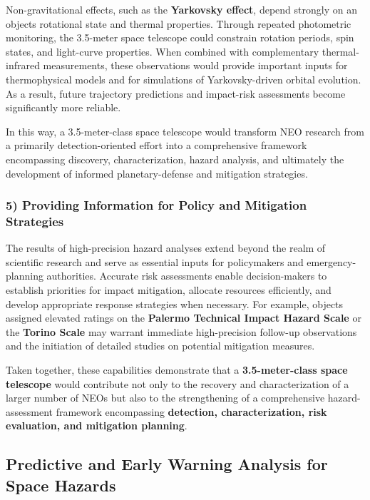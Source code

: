 Non-gravitational effects, such as the \textbf{Yarkovsky effect}, depend strongly on an object\textquotesingle s rotational state and thermal properties. 
Through repeated photometric monitoring, the 3.5-meter space telescope
could constrain rotation periods, spin states, and light-curve properties.
When combined with complementary thermal-infrared measurements, these
observations would provide important inputs for thermophysical models and
for simulations of Yarkovsky-driven orbital evolution.
As a result, future trajectory predictions and impact-risk assessments become significantly more reliable.

In this way, a 3.5-meter-class space telescope would transform NEO research from a primarily detection-oriented effort into a comprehensive framework encompassing discovery, characterization, hazard analysis, and ultimately the development of informed planetary-defense and mitigation strategies.

\subsubsection{5) Providing Information for Policy and Mitigation Strategies}\label{providing-information-for-policy-and-mitigation-strategies}

The results of high-precision hazard analyses extend beyond the realm of scientific research and serve as essential inputs for policymakers and emergency-planning authorities. Accurate risk assessments enable decision-makers to establish priorities for impact mitigation, allocate resources efficiently, and develop appropriate response strategies when necessary. For example, objects assigned elevated ratings on the \textbf{Palermo Technical Impact Hazard Scale} or the \textbf{Torino Scale} may warrant immediate high-precision follow-up observations and the initiation of detailed studies on potential mitigation measures.

Taken together, these capabilities demonstrate that a \textbf{3.5-meter-class space telescope} would contribute not only to the recovery and characterization of a larger number of NEOs but also to the strengthening of a comprehensive hazard-assessment framework encompassing \textbf{detection, characterization, risk evaluation, and mitigation planning}.

\subsection{Predictive and Early Warning Analysis for Space Hazards}

